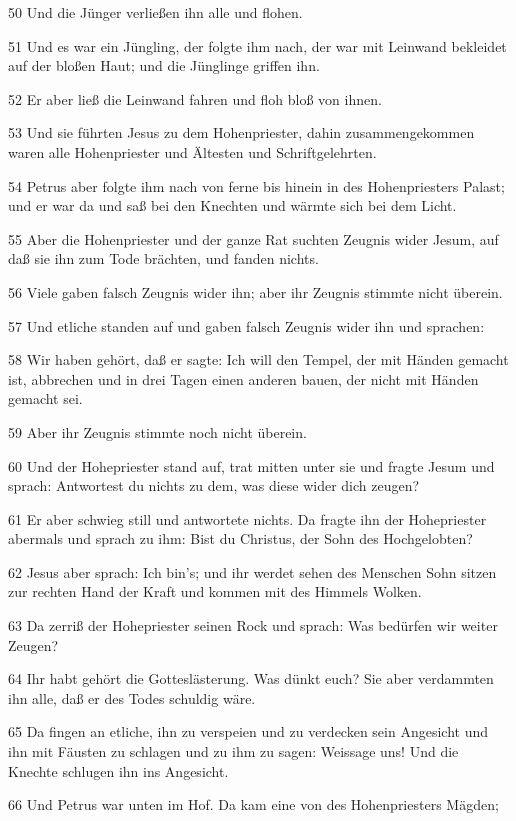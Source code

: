 \par 50 Und die Jünger verließen ihn alle und flohen.
\par 51 Und es war ein Jüngling, der folgte ihm nach, der war mit Leinwand bekleidet auf der bloßen Haut; und die Jünglinge griffen ihn.
\par 52 Er aber ließ die Leinwand fahren und floh bloß von ihnen.
\par 53 Und sie führten Jesus zu dem Hohenpriester, dahin zusammengekommen waren alle Hohenpriester und Ältesten und Schriftgelehrten.
\par 54 Petrus aber folgte ihm nach von ferne bis hinein in des Hohenpriesters Palast; und er war da und saß bei den Knechten und wärmte sich bei dem Licht.
\par 55 Aber die Hohenpriester und der ganze Rat suchten Zeugnis wider Jesum, auf daß sie ihn zum Tode brächten, und fanden nichts.
\par 56 Viele gaben falsch Zeugnis wider ihn; aber ihr Zeugnis stimmte nicht überein.
\par 57 Und etliche standen auf und gaben falsch Zeugnis wider ihn und sprachen:
\par 58 Wir haben gehört, daß er sagte: Ich will den Tempel, der mit Händen gemacht ist, abbrechen und in drei Tagen einen anderen bauen, der nicht mit Händen gemacht sei.
\par 59 Aber ihr Zeugnis stimmte noch nicht überein.
\par 60 Und der Hohepriester stand auf, trat mitten unter sie und fragte Jesum und sprach: Antwortest du nichts zu dem, was diese wider dich zeugen?
\par 61 Er aber schwieg still und antwortete nichts. Da fragte ihn der Hohepriester abermals und sprach zu ihm: Bist du Christus, der Sohn des Hochgelobten?
\par 62 Jesus aber sprach: Ich bin's; und ihr werdet sehen des Menschen Sohn sitzen zur rechten Hand der Kraft und kommen mit des Himmels Wolken.
\par 63 Da zerriß der Hohepriester seinen Rock und sprach: Was bedürfen wir weiter Zeugen?
\par 64 Ihr habt gehört die Gotteslästerung. Was dünkt euch? Sie aber verdammten ihn alle, daß er des Todes schuldig wäre.
\par 65 Da fingen an etliche, ihn zu verspeien und zu verdecken sein Angesicht und ihn mit Fäusten zu schlagen und zu ihm zu sagen: Weissage uns! Und die Knechte schlugen ihn ins Angesicht.
\par 66 Und Petrus war unten im Hof. Da kam eine von des Hohenpriesters Mägden;
